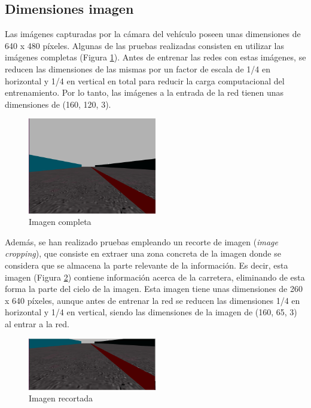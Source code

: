\subsection{Dimensiones imagen}

Las imágenes capturadas por la cámara del vehículo poseen unas dimensiones de 640 x 480 píxeles. Algunas de las pruebas realizadas consisten en utilizar las imágenes completas (Figura \ref{fig.completa_reg}). Antes de entrenar las redes con estas imágenes, se reducen las dimensiones de las mismas por un factor de escala de 1/4 en horizontal y 1/4 en vertical en total para reducir la carga computacional del entrenamiento. Por lo tanto, las imágenes a la entrada de la red tienen unas dimensiones de (160, 120, 3).\\

\begin{figure}
\begin{center}
	\includegraphics[width=0.5\textwidth]{figures/Regresion/img_normal.png}
   \caption{Imagen completa}
	\label{fig.completa_reg}
\end{center}
\end{figure}

Además, se han realizado pruebas empleando un recorte de imagen (\textit{image cropping}), que consiste en extraer una zona concreta de la imagen donde se considera que se almacena la parte relevante de la información. Es decir, esta imagen (Figura \ref{fig.recortada_reg}) contiene información acerca de la carretera, eliminando de esta forma la parte del cielo de la imagen. Esta imagen tiene unas dimensiones de 260 x 640 píxeles, aunque antes de entrenar la red se reducen las dimensiones 1/4 en horizontal y 1/4 en vertical, siendo las dimensiones de la imagen de (160, 65, 3) al entrar a la red.\\

\begin{figure}
\begin{center}
	\includegraphics[width=0.5\textwidth]{figures/Regresion/img_cropped_reg.png}
   \caption{Imagen recortada}
	\label{fig.recortada_reg}
\end{center}
\end{figure}

